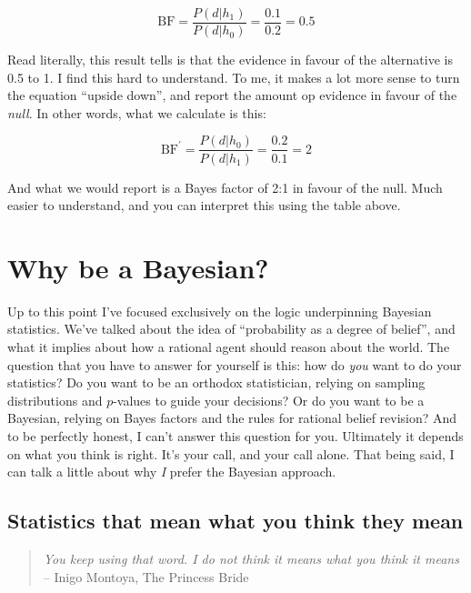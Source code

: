 $$ 
\mbox{BF} = \frac{P(d|h_1)}{P(d|h_0)} = \frac{0.1}{0.2} = 0.5
$$

\noindent
Read literally, this result tells is that the evidence in favour of the alternative is 0.5 to 1. I find this hard to understand. To me, it makes  a lot more sense to turn the equation ``upside down'', and report the amount op evidence in favour of the {\it null}. In other words, what we calculate is this:

$$ 
\mbox{BF}^\prime = \frac{P(d|h_0)}{P(d|h_1)} = \frac{0.2}{0.1} = 2
$$

\noindent
And what we would report is a Bayes factor of 2:1 in favour of the null. Much easier to understand, and you can interpret this using the table above. 




\section{Why be a Bayesian?\label{sec:whybayes}}

Up to this point I've focused exclusively on the logic underpinning Bayesian statistics. We've talked about the idea of ``probability as a degree of belief'', and what it implies about how a rational agent should reason about the world. The question that you have to answer for yourself is this: how do {\it you} want to do your statistics? Do you want to be an orthodox statistician, relying on sampling distributions and $p$-values to guide your decisions? Or do you want to be a Bayesian, relying on Bayes factors and the rules for rational belief revision? And to be perfectly honest, I can't answer this question for you. Ultimately it depends on what you think is right. It's your call, and your call alone. That being said, I can talk a little about why {\it I} prefer the Bayesian approach. 

\subsection{Statistics that mean what you think they mean}

\begin{quote}
{\it You keep using that word. I do not think it means what you think it means} \\
\hspace*{2cm} -- Inigo Montoya, The Princess Bride
\end{quote}


